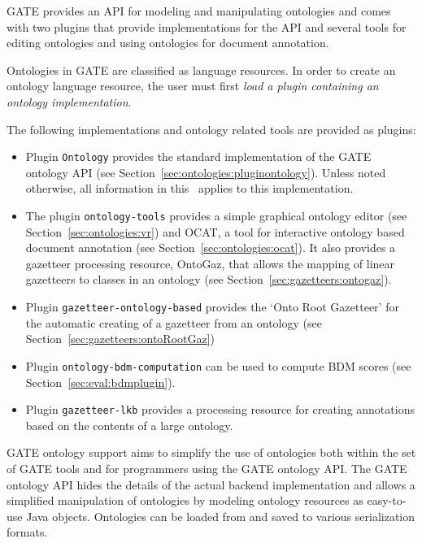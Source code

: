

GATE provides an API for modeling and manipulating ontologies and 
comes with two plugins that provide implementations for the API  
and several tools for 
editing ontologies and using ontologies for document annotation. 


Ontologies in GATE are classified as language resources. In order to create 
an ontology language resource, the user must first  
\emph{load a plugin containing an ontology implementation}.

The following implementations and ontology related tools are provided 
as plugins:
\begin{itemize}
\item Plugin \texttt{Ontology} provides the standard implementation of the GATE
ontology API (see Section~\ref{sec:ontologies:pluginontology}).
Unless noted otherwise, all information in this \chapthing\ applies to this
implementation.
\item The plugin \texttt{ontology-tools} provides a simple graphical ontology 
editor (see Section~\ref{sec:ontologies:vr}) and OCAT, a tool for interactive ontology based
document annotation (see Section~\ref{sec:ontologies:ocat}). It also provides a gazetteer
processing resource, OntoGaz, that allows the mapping of linear 
gazetteers to classes in an ontology (see Section~\ref{sec:gazetteers:ontogaz}).
\item Plugin \texttt{gazetteer-ontology-based} provides the `Onto Root
Gazetteer' for the automatic creating of a gazetteer from an ontology 
(see Section~\ref{sec:gazetteers:ontoRootGaz})
\item Plugin \texttt{ontology-bdm-computation} can be used to compute BDM
scores (see Section~\ref{sec:eval:bdmplugin}).
\item Plugin \texttt{gazetteer-lkb} provides a processing resource for
creating annotations based on the contents of a large ontology.
\end{itemize}

GATE ontology support aims to simplify the use of ontologies both 
within the set of GATE tools and for programmers using the GATE ontology
API. The GATE ontology API hides the details of the actual backend
implementation and allows a simplified manipulation of 
ontologies by modeling ontology resources as easy-to-use Java objects.
Ontologies can be loaded from and saved to various serialization 
formats. 

